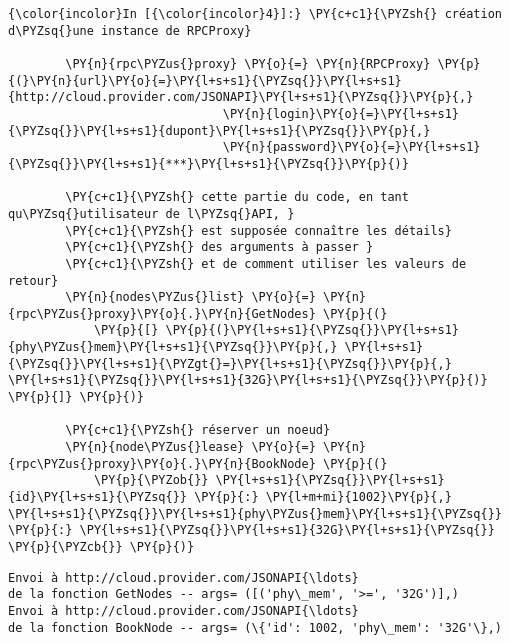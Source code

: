     \begin{Verbatim}[commandchars=\\\{\},frame=single,framerule=0.3mm,rulecolor=\color{cellframecolor}]
{\color{incolor}In [{\color{incolor}4}]:} \PY{c+c1}{\PYZsh{} création d\PYZsq{}une instance de RPCProxy}
        
        \PY{n}{rpc\PYZus{}proxy} \PY{o}{=} \PY{n}{RPCProxy} \PY{p}{(}\PY{n}{url}\PY{o}{=}\PY{l+s+s1}{\PYZsq{}}\PY{l+s+s1}{http://cloud.provider.com/JSONAPI}\PY{l+s+s1}{\PYZsq{}}\PY{p}{,} 
                              \PY{n}{login}\PY{o}{=}\PY{l+s+s1}{\PYZsq{}}\PY{l+s+s1}{dupont}\PY{l+s+s1}{\PYZsq{}}\PY{p}{,}
                              \PY{n}{password}\PY{o}{=}\PY{l+s+s1}{\PYZsq{}}\PY{l+s+s1}{***}\PY{l+s+s1}{\PYZsq{}}\PY{p}{)}
        
        \PY{c+c1}{\PYZsh{} cette partie du code, en tant qu\PYZsq{}utilisateur de l\PYZsq{}API, }
        \PY{c+c1}{\PYZsh{} est supposée connaître les détails}
        \PY{c+c1}{\PYZsh{} des arguments à passer }
        \PY{c+c1}{\PYZsh{} et de comment utiliser les valeurs de retour}
        \PY{n}{nodes\PYZus{}list} \PY{o}{=} \PY{n}{rpc\PYZus{}proxy}\PY{o}{.}\PY{n}{GetNodes} \PY{p}{(} 
            \PY{p}{[} \PY{p}{(}\PY{l+s+s1}{\PYZsq{}}\PY{l+s+s1}{phy\PYZus{}mem}\PY{l+s+s1}{\PYZsq{}}\PY{p}{,} \PY{l+s+s1}{\PYZsq{}}\PY{l+s+s1}{\PYZgt{}=}\PY{l+s+s1}{\PYZsq{}}\PY{p}{,} \PY{l+s+s1}{\PYZsq{}}\PY{l+s+s1}{32G}\PY{l+s+s1}{\PYZsq{}}\PY{p}{)} \PY{p}{]} \PY{p}{)}
        
        \PY{c+c1}{\PYZsh{} réserver un noeud}
        \PY{n}{node\PYZus{}lease} \PY{o}{=} \PY{n}{rpc\PYZus{}proxy}\PY{o}{.}\PY{n}{BookNode} \PY{p}{(}
            \PY{p}{\PYZob{}} \PY{l+s+s1}{\PYZsq{}}\PY{l+s+s1}{id}\PY{l+s+s1}{\PYZsq{}} \PY{p}{:} \PY{l+m+mi}{1002}\PY{p}{,} \PY{l+s+s1}{\PYZsq{}}\PY{l+s+s1}{phy\PYZus{}mem}\PY{l+s+s1}{\PYZsq{}} \PY{p}{:} \PY{l+s+s1}{\PYZsq{}}\PY{l+s+s1}{32G}\PY{l+s+s1}{\PYZsq{}} \PY{p}{\PYZcb{}} \PY{p}{)}
\end{Verbatim}


    \begin{Verbatim}[commandchars=\\\{\},frame=single,framerule=0.3mm,rulecolor=\color{cellframecolor}]
Envoi à http://cloud.provider.com/JSONAPI{\ldots}
de la fonction GetNodes -- args= ([('phy\_mem', '>=', '32G')],)
Envoi à http://cloud.provider.com/JSONAPI{\ldots}
de la fonction BookNode -- args= (\{'id': 1002, 'phy\_mem': '32G'\},)
\end{Verbatim}


    
    
    
